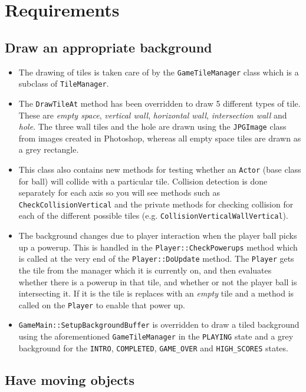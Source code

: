 \section{Requirements}

\subsection{Draw an appropriate background}

\begin{itemize}
	\item The drawing of tiles is taken care of by the \verb!GameTileManager! class which is a subclass of \verb!TileManager!.
	\item The \verb!DrawTileAt! method has been overridden to draw 5 different types of tile. These are \emph{empty space}, \emph{vertical wall}, \emph{horizontal wall}, \emph{intersection wall} and \emph{hole}. The three wall tiles and the hole are drawn using the \verb!JPGImage! class from images created in Photoshop, whereas all empty space tiles are drawn as a grey rectangle.
	\item This class also contains new methods for testing whether an \verb!Actor! (base class for ball) will collide with a particular tile. Collision detection is done separately for each axis so you will see methods such as \verb!CheckCollisionVertical! and the private methods for checking collision for each of the different possible tiles (e.g. \verb!CollisionVerticalWallVertical!).
	\item The background changes due to player interaction when the player ball picks up a powerup. This is handled in the \verb!Player::CheckPowerups! method which is called at the very end of the \verb!Player::DoUpdate! method. The \verb!Player! gets the tile from the manager which it is currently on, and then evaluates whether there is a powerup in that tile, and whether or not the player ball is intersecting it. If it is the tile is replaces with an \emph{empty} tile and a method is called on the \verb!Player! to enable that power up.
	\item \verb!GameMain::SetupBackgroundBuffer! is overridden to draw a tiled background using the aforementioned \verb!GameTileManager! in the \verb!PLAYING! state and a grey background for the \verb!INTRO!, \verb!COMPLETED!, \verb!GAME_OVER! and \verb!HIGH_SCORES! states.
\end{itemize}

\subsection{Have moving objects}

